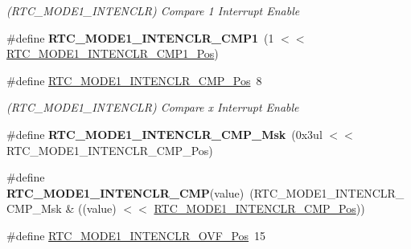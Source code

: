 \begin{DoxyCompactItemize}
\begin{DoxyCompactList}\small\item\em (R\+T\+C\+\_\+\+M\+O\+D\+E1\+\_\+\+I\+N\+T\+E\+N\+C\+L\+R) Compare 1 Interrupt Enable \end{DoxyCompactList}\item 
\hypertarget{group___s_a_m_l21___r_t_c_gac86fdadc0f7aa1633d8815aa8e5d3df3}{}\#define {\bfseries R\+T\+C\+\_\+\+M\+O\+D\+E1\+\_\+\+I\+N\+T\+E\+N\+C\+L\+R\+\_\+\+C\+M\+P1}~(1 $<$$<$ \hyperlink{group___s_a_m_l21___r_t_c_ga57240eb2e86afb12d85412cdf775876a}{R\+T\+C\+\_\+\+M\+O\+D\+E1\+\_\+\+I\+N\+T\+E\+N\+C\+L\+R\+\_\+\+C\+M\+P1\+\_\+\+Pos})\label{group___s_a_m_l21___r_t_c_gac86fdadc0f7aa1633d8815aa8e5d3df3}

\item 
\hypertarget{group___s_a_m_l21___r_t_c_ga5573547a4b7970bba49213f6f8f191b3}{}\#define \hyperlink{group___s_a_m_l21___r_t_c_ga5573547a4b7970bba49213f6f8f191b3}{R\+T\+C\+\_\+\+M\+O\+D\+E1\+\_\+\+I\+N\+T\+E\+N\+C\+L\+R\+\_\+\+C\+M\+P\+\_\+\+Pos}~8\label{group___s_a_m_l21___r_t_c_ga5573547a4b7970bba49213f6f8f191b3}

\begin{DoxyCompactList}\small\item\em (R\+T\+C\+\_\+\+M\+O\+D\+E1\+\_\+\+I\+N\+T\+E\+N\+C\+L\+R) Compare x Interrupt Enable \end{DoxyCompactList}\item 
\hypertarget{group___s_a_m_l21___r_t_c_ga18c87df5459027d90dc58ce0e6588926}{}\#define {\bfseries R\+T\+C\+\_\+\+M\+O\+D\+E1\+\_\+\+I\+N\+T\+E\+N\+C\+L\+R\+\_\+\+C\+M\+P\+\_\+\+Msk}~(0x3ul $<$$<$ R\+T\+C\+\_\+\+M\+O\+D\+E1\+\_\+\+I\+N\+T\+E\+N\+C\+L\+R\+\_\+\+C\+M\+P\+\_\+\+Pos)\label{group___s_a_m_l21___r_t_c_ga18c87df5459027d90dc58ce0e6588926}

\item 
\hypertarget{group___s_a_m_l21___r_t_c_gab27c4c5b97cc71392e38b3737d21932a}{}\#define {\bfseries R\+T\+C\+\_\+\+M\+O\+D\+E1\+\_\+\+I\+N\+T\+E\+N\+C\+L\+R\+\_\+\+C\+M\+P}(value)~(R\+T\+C\+\_\+\+M\+O\+D\+E1\+\_\+\+I\+N\+T\+E\+N\+C\+L\+R\+\_\+\+C\+M\+P\+\_\+\+Msk \& ((value) $<$$<$ \hyperlink{group___s_a_m_l21___r_t_c_ga5573547a4b7970bba49213f6f8f191b3}{R\+T\+C\+\_\+\+M\+O\+D\+E1\+\_\+\+I\+N\+T\+E\+N\+C\+L\+R\+\_\+\+C\+M\+P\+\_\+\+Pos}))\label{group___s_a_m_l21___r_t_c_gab27c4c5b97cc71392e38b3737d21932a}

\item 
\hypertarget{group___s_a_m_l21___r_t_c_ga9a15931c238440000ed2afdd93634514}{}\#define \hyperlink{group___s_a_m_l21___r_t_c_ga9a15931c238440000ed2afdd93634514}{R\+T\+C\+\_\+\+M\+O\+D\+E1\+\_\+\+I\+N\+T\+E\+N\+C\+L\+R\+\_\+\+O\+V\+F\+\_\+\+Pos}~15\label{group___s_a_m_l21___r_t_c_ga9a15931c238440000ed2afdd93634514}


\end{DoxyCompactItemize}
